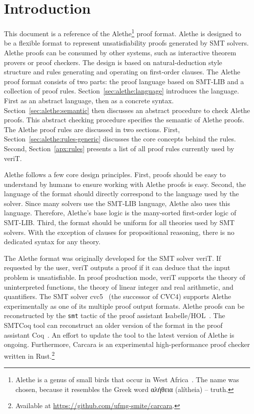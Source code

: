\documentclass{scrartcl}
\newcommand\smtlib{SMT-LIB}
\newcommand\tool[1]{\textsf{#1}}
\newcommand\tactic[1]{\texttt{#1}}
\newcommand\verit{\tool{veriT}}
\newcommand\cvcfive{\tool{cvc5}}
\newcommand\cvcfour{\tool{CVC4}}
\newcommand\isabelle{\tool{Isabelle/HOL}}
\theoremstyle{definition}
\begin{document}
\section{Introduction}
This document is a reference of the
Alethe\footnote{Alethe is a genus of small birds that occur in West Africa~\cite{wp:alethe}.
The name was chosen, because it
resembles the Greek word {αλήθεια} (alítheia) -- truth.} proof format.  Alethe is
designed to be a flexible format to represent unsatisfiability proofs
generated by SMT solvers.  Alethe proofs can be consumed by other systems,
such as interactive theorem provers or proof checkers.  The design
is based on natural-deduction style structure
and rules generating and operating on first-order clauses.
%
The Alethe proof format consists of two parts: the proof
language based on {\smtlib} and a collection of proof rules.
Section~\ref{sec:alethe:language} introduces the language.  First as an
abstract language, then as a concrete syntax.
Section~\ref{sec:alethe:semantic} then discusses an abstract procedure
to check Alethe proofs.  This abstract checking procedure specifies
the semantic of Alethe proofs.
%
The Alethe proof rules are discussed in two sections.
First, Section~\ref{sec:alethe:rules-generic} discusses the core
concepts behind the rules.
%
Second, Section~\ref{apx:rules} presents a list of
all proof rules currently used by {\verit}.

Alethe follows a few core design principles.  First, proofs should
be easy to understand by humans to ensure working with Alethe proofs
is easy.  Second, the language of the format should directly
correspond to the language used by the solver.  Since many solvers use the
{\smtlib} language, Alethe also uses this language.
Therefore, Alethe's base logic is the many-sorted first-order logic of {\smtlib}.
Third, the format should
be uniform for all theories used by SMT solvers.  With the exception
of clauses for propositional reasoning, there is no dedicated syntax for
any theory.

The Alethe format was originally developed for the SMT solver {\verit}. If requested
by the user, {\verit} outputs a proof if it can deduce that the input problem is
unsatisfiable. In proof production mode, {\verit} supports the theory of
uninterpreted functions, the theory of linear integer and real arithmetic, and
quantifiers.
The SMT solver {\cvcfive}~\cite{barbosa-2022} (the successor of
{\cvcfour}) supports Alethe experimentally as one of its multiple proof
output formats.
%
Alethe proofs can be reconstructed by the \tactic{smt} tactic of
the proof assistant {\isabelle}~\cite{fleury-2019,schurr-2021}.
The \tool{SMTCoq} tool can
reconstruct an older version of the format in the
proof assistant \tool{Coq}~\cite{SMTCoq}.  An effort to update the
tool to the latest version of Alethe is ongoing.
%
Furthermore, \tool{Carcara} is an experimental
high-performance proof checker written in Rust.\footnote{Available at
\url{https://github.com/ufmg-smite/carcara}.}
\end{document}
